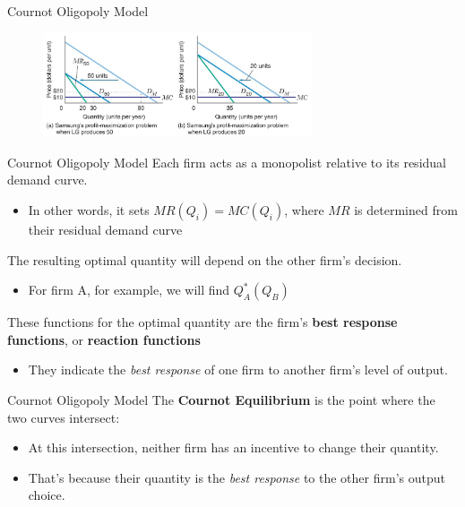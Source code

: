 \documentclass[11pt,t]{beamer}
\begin{document}
\begin{frame}{Cournot Oligopoly Model}
  \begin{figure}
    \includegraphics[width=300px]{figures/fig13_1.jpg}
  \end{figure}
\end{frame}

\begin{frame}{Cournot Oligopoly Model}
  Each firm acts as a monopolist relative to its residual demand curve.

  \begin{itemize}
    \item In other words, it sets $MR(Q_i) = MC(Q_i)$, where $MR$ is determined from their residual demand curve
  \end{itemize}
  
  \bigskip\pause
  The resulting optimal quantity will depend on the other firm's decision.

  \begin{itemize}
    \item For firm A, for example, we will find $Q_A^*(Q_B)$
  \end{itemize}

  \bigskip
  These functions for the optimal quantity are the firm's \textbf{best response functions}, or \textbf{reaction functions}
  \begin{itemize}
    \item They indicate the \textit{best response} of one firm to another firm's level of output.
  \end{itemize}
\end{frame}

\begin{frame}{Cournot Oligopoly Model}
  The \textbf{Cournot Equilibrium} is the point where the two curves intersect:
  \begin{itemize}
    \item At this intersection, neither firm has an incentive to change their quantity.
    \item That's because their quantity is the \textit{best response} to the other firm's output choice.
  \end{itemize}
\end{frame}
\end{document}
